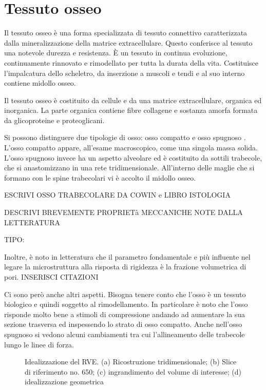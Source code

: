 \documentclass[a4paper,num-refs]{oup-contemporary}
\begin{document}
\section{Tessuto osseo}

Il tessuto osseo è una forma specializzata di tessuto connettivo caratterizzata dalla mineralizzazione della matrice extracellulare. Questo conferisce al tessuto una notevole durezza e resistenza. È un tessuto in continua evoluzione, continuamente rinnovato e rimodellato per tutta la durata della vita. Costituisce l'impalcatura dello scheletro, da inserzione a muscoli e tendi e al suo interno contiene midollo osseo. 

Il tessuto osseo è costituito da cellule e da una matrice extracellulare, organica ed inorganica. La parte organica contiene fibre collagene e sostanza amorfa formata da glicoproteine e proteoglicani. 

Si possono distinguere due tipologie di osso: osso compatto e osso spugnoso \citep{Monesi}. 
L'osso compatto appare, all'esame macroscopico, come una singola massa solida. L'osso spugnoso invece ha un aspetto alveolare ed è costituito da sottili trabecole, che si anastomizzano in una rete tridimensionale. All'interno delle maglie che si formano con le spine trabecolari vi è accolto il midollo osseo.






ESCRIVI OSSO TRABECOLARE DA COWIN e LIBRO ISTOLOGIA

DESCRIVI BREVEMENTE PROPRIETà MECCANICHE NOTE DALLA LETTERATURA

TIPO:

Inoltre, è noto in letteratura che il parametro fondamentale e più influente nel legare la microstruttura alla risposta di rigidezza è la frazione volumetrica di pori. INSERISCI CITAZIONI

Ci sono però anche altri aspetti. Bisogna tenere conto che l'osso è un tessuto biologico e quindi soggetto al rimodellamento. In particolare è noto che l'osso risponde molto bene a stimoli di compressione andando ad aumentare la sua sezione trasversa ed inspessendo lo strato di osso compatto. Anche nell'osso spugnoso si vedono alcuni cambiamenti tra cui l'allineamento delle trabecole lungo le linee di forza.  \citep{Ferguson:2003}


\begin{figure}%
	\centering
	\def\svgwidth{\textwidth}

	\caption{Idealizzazione del RVE. (a) Ricostruzione tridimensionale; (b) Slice di riferimento no. 650; (c) ingrandimento del volume di interesse; (d) idealizzazione geometrica} 
\label{fig:homogen_RVE}
\end{figure}
\end{document}
